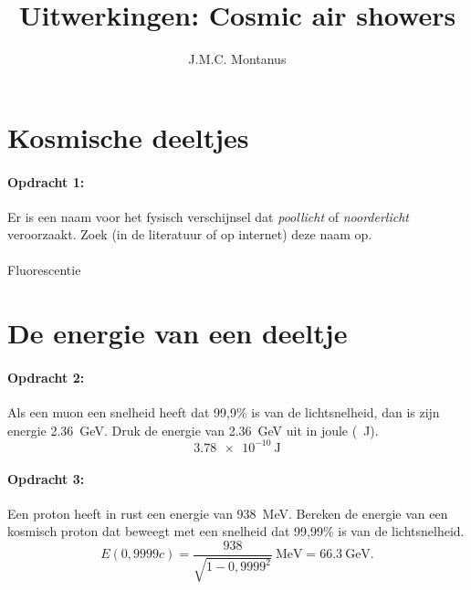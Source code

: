 

\title{Uitwerkingen: Cosmic air showers}
\author{J.M.C. Montanus}



\maketitle

\section{Kosmische deeltjes}

\begin{minipage}[t]{1\columnwidth}
\paragraph{Opdracht 1:}
Er is een naam voor het fysisch verschijnsel dat \emph{poollicht} of
\emph{noorderlicht} veroorzaakt. Zoek (in de literatuur of op internet)
deze naam op.
\\ \\
Fluorescentie
\end{minipage}


\section{De energie van een deeltje}

\begin{minipage}[t]{1\columnwidth}
\paragraph{Opdracht 2:}
Als een muon een snelheid heeft dat 99,9\% is van de lichtsnelheid, dan
is zijn energie \SI{2,36}{\giga\electronvolt}. Druk de energie van
\SI{2,36}{\giga\electronvolt} uit in joule (\SI{}{\joule}).
\begin{equation} 
\SI{3,78e-10}{\joule} \nonumber
\end{equation}
\end{minipage}
\smallskip{}

\begin{minipage}[t]{1\columnwidth}
\paragraph{Opdracht 3:}
Een proton heeft in rust een energie van \SI{938}{\mega\electronvolt}.
Bereken de energie van een kosmisch proton dat beweegt met een snelheid
dat 99,99\% is van de lichtsnelheid.
\begin{equation} 
    E(0,9999c) = \frac{938}{\sqrt{1-0,9999^2}}\SI{}{\mega\electronvolt}
    = \SI{66,3}{\giga\electronvolt}. \nonumber
\end{equation}
\end{minipage}
\bigskip{}

